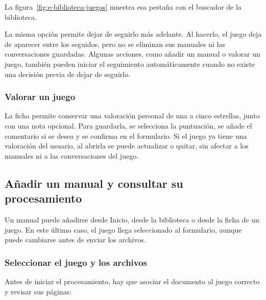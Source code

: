 La figura~\ref{fig:e-biblioteca-juegos} muestra esa pestaña con el buscador
de la biblioteca.


La misma opción permite dejar de seguirlo más adelante. Al hacerlo, el
juego deja de aparecer entre los seguidos, pero no se eliminan sus manuales
ni las conversaciones guardadas. Algunas acciones, como añadir un manual o
valorar un juego, también pueden iniciar el seguimiento automáticamente
cuando no existe una decisión previa de dejar de seguirlo.

\subsubsection{Valorar un juego}

La ficha permite conservar una valoración personal de una a cinco
estrellas, junto con una nota opcional. Para guardarla, se selecciona la
puntuación, se añade el comentario si se desea y se confirma en el
formulario. Si el juego ya tiene una valoración del usuario, al abrirla se
puede actualizar o quitar, sin afectar a los manuales ni a las
conversaciones del juego.

\subsection{Añadir un manual y consultar su procesamiento}
\label{sec:e-anadir-manual}

Un manual puede añadirse desde \guillemotleft{}Inicio\guillemotright{},
desde la biblioteca o desde la ficha de un juego. En este último caso, el
juego llega seleccionado al formulario, aunque puede cambiarse antes de
enviar los archivos.

\subsubsection{Seleccionar el juego y los archivos}

Antes de iniciar el procesamiento, hay que asociar el documento al juego
correcto y revisar sus páginas:

